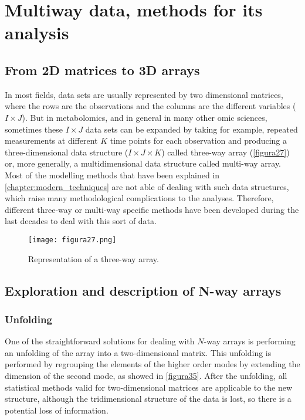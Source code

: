 
\chapter[Multiway data, methods for its analysis]{Multiway data, methods for its analysis}
\label{chapter:threeways}


\section{From 2D matrices to 3D arrays}
In most fields, data sets are usually represented by two dimensional matrices, where the rows are the observations and the columns are the different variables ($I \times J$). But in metabolomics, and in general in many other omic sciences, sometimes these $I \times J$ data sets can be expanded by taking for example, repeated measurements at different $K$ time points for each observation and producing a three-dimensional data structure ($I \times J \times K$) called three-way array (\autoref{figura27}) or, more generally, a multidimensional data structure called multi-way array. Most of the modelling methods that have been explained in \autoref{chapter:modern_techniques} are not able of dealing with such data structures, which raise many methodological complications to the analyses. Therefore, different three-way or multi-way specific methods have been developed during the last decades to deal with this sort of data.

\begin{figure}[hbtp]
\centering
\texttt{[image: figura27.png]}
\caption{Representation of a three-way array.}
\label{figura27}
\end{figure}

\section{Exploration and description of N-way arrays}
\subsection{Unfolding}
One of the straightforward solutions for dealing with $N$-way arrays is performing an unfolding of the array into a two-dimensional matrix. This unfolding is performed by regrouping the elements of the higher order modes by extending the dimension of the second mode, as showed in \autoref{figura35}. After the unfolding, all statistical methods valid for two-dimensional matrices are applicable to the new structure, although the tridimensional structure of the data is lost, so there is a potential loss of information.

